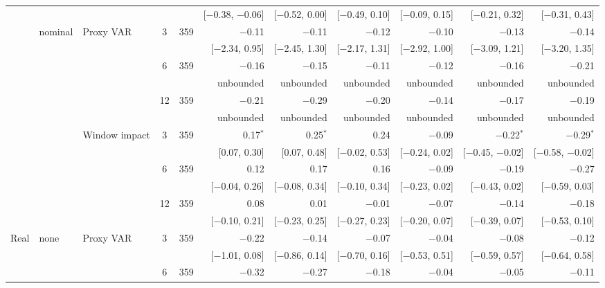 \begin{longtable}{lllcrrrrrrr}
 & & & & & {\tiny [$-$0.38, $-$0.06]} & {\tiny [$-$0.52, 0.00]} & {\tiny [$-$0.49, 0.10]} & {\tiny [$-$0.09, 0.15]} & {\tiny [$-$0.21, 0.32]} & {\tiny [$-$0.31, 0.43]}\\
 & nominal & Proxy VAR & 3 & 359 & $-$0.11 & $-$0.11 & $-$0.12 & $-$0.10 & $-$0.13 & $-$0.14\\
 & & & & & {\tiny [$-$2.34, 0.95]} & {\tiny [$-$2.45, 1.30]} & {\tiny [$-$2.17, 1.31]} & {\tiny [$-$2.92, 1.00]} & {\tiny [$-$3.09, 1.21]} & {\tiny [$-$3.20, 1.35]}\\
 &  &  & 6 & 359 & $-$0.16 & $-$0.15 & $-$0.11 & $-$0.12 & $-$0.16 & $-$0.21\\
 & & & & & {\tiny unbounded} & {\tiny unbounded} & {\tiny unbounded} & {\tiny unbounded} & {\tiny unbounded} & {\tiny unbounded}\\
 &  &  & 12 & 359 & $-$0.21 & $-$0.29 & $-$0.20 & $-$0.14 & $-$0.17 & $-$0.19\\
 & & & & & {\tiny unbounded} & {\tiny unbounded} & {\tiny unbounded} & {\tiny unbounded} & {\tiny unbounded} & {\tiny unbounded}\\
 &  & Window impact & 3 & 359 & 0.17$^{*}$ & 0.25$^{*}$ & 0.24 & $-$0.09 & $-$0.22$^{*}$ & $-$0.29$^{*}$\\
 & & & & & {\tiny [0.07, 0.30]} & {\tiny [0.07, 0.48]} & {\tiny [$-$0.02, 0.53]} & {\tiny [$-$0.24, 0.02]} & {\tiny [$-$0.45, $-$0.02]} & {\tiny [$-$0.58, $-$0.02]}\\
 &  &  & 6 & 359 & 0.12 & 0.17 & 0.16 & $-$0.09 & $-$0.19 & $-$0.27\\
 & & & & & {\tiny [$-$0.04, 0.26]} & {\tiny [$-$0.08, 0.34]} & {\tiny [$-$0.10, 0.34]} & {\tiny [$-$0.23, 0.02]} & {\tiny [$-$0.43, 0.02]} & {\tiny [$-$0.59, 0.03]}\\
 &  &  & 12 & 359 & 0.08 & 0.01 & $-$0.01 & $-$0.07 & $-$0.14 & $-$0.18\\
 & & & & & {\tiny [$-$0.10, 0.21]} & {\tiny [$-$0.23, 0.25]} & {\tiny [$-$0.27, 0.23]} & {\tiny [$-$0.20, 0.07]} & {\tiny [$-$0.39, 0.07]} & {\tiny [$-$0.53, 0.10]}\\
\addlinespace
Real & none & Proxy VAR & 3 & 359 & $-$0.22 & $-$0.14 & $-$0.07 & $-$0.04 & $-$0.08 & $-$0.12\\
 & & & & & {\tiny [$-$1.01, 0.08]} & {\tiny [$-$0.86, 0.14]} & {\tiny [$-$0.70, 0.16]} & {\tiny [$-$0.53, 0.51]} & {\tiny [$-$0.59, 0.57]} & {\tiny [$-$0.64, 0.58]}\\
 &  &  & 6 & 359 & $-$0.32 & $-$0.27 & $-$0.18 & $-$0.04 & $-$0.05 & $-$0.11\\

\end{longtable}
